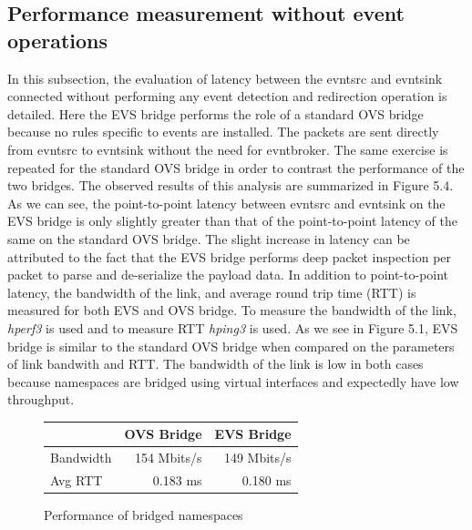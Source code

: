 \subsection{Performance measurement without event operations}
In this subsection, the evaluation of latency between the evntsrc and evntsink connected without performing any event detection and redirection operation is detailed. Here the EVS bridge performs the role of a standard OVS bridge because no rules specific to events are installed. The packets are sent directly from evntsrc to evntsink without the need for evntbroker. The same exercise is repeated for the standard OVS bridge in order to contrast the performance of the two bridges. The observed results of this analysis are summarized in Figure 5.4. As we can see, the point-to-point latency between evntsrc and evntsink on the EVS bridge is only slightly greater than that of the point-to-point latency of the same on the standard OVS bridge. The slight increase in latency can be attributed to the fact that the EVS bridge performs deep packet inspection per packet to parse and de-serialize the payload data. 
\newline
In addition to point-to-point latency, the bandwidth of the link, and average round trip time (RTT) is measured for both EVS and OVS bridge. To measure the bandwidth of the link, \textit{hperf3} is used and to measure RTT \textit{hping3} is used. As we see in Figure 5.1, EVS bridge is similar to the standard OVS bridge when compared on the parameters of link bandwith and RTT. The bandwidth of the link is  low in both  cases because namespaces are bridged using virtual interfaces and expectedly have low throughput.
\begin{figure}[H]
\centering
\caption{Performance of bridged namespaces}
\hfill
 \begin{tabular} {lrr}
 \toprule
 \hline
 &  OVS Bridge & EVS Bridge  \\ \midrule
 \hline 
 Bandwidth &  154 Mbits/s & 149 Mbits/s  \\ 
 \hline
 Avg RTT & 0.183 ms & 0.180 ms  \\ \bottomrule
 \hline 
\end{tabular}
\end{figure}


